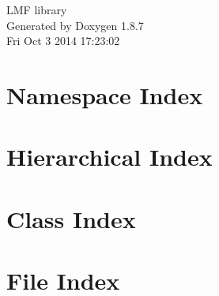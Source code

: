 \documentclass[twoside]{book}
\newcommand{\+}{\discretionary{\mbox{\scriptsize$\hookleftarrow$}}{}{}}
\newcommand{\clearemptydoublepage}{%
  \newpage{\pagestyle{empty}\cleardoublepage}%
}
\begin{document}
\hypersetup{pageanchor=false,
             bookmarks=true,
             bookmarksnumbered=true,
             pdfencoding=unicode
            }
\begin{titlepage}
\vspace*{7cm}
\begin{center}%
{\Large L\+M\+F library }\\
\vspace*{1cm}
{\large Generated by Doxygen 1.8.7}\\
\vspace*{0.5cm}
{\small Fri Oct 3 2014 17:23:02}\\
\end{center}
\end{titlepage}
\clearemptydoublepage
\tableofcontents
\clearemptydoublepage
{}
\hypersetup{pageanchor=true}

\chapter{Namespace Index}

\chapter{Hierarchical Index}

\chapter{Class Index}

\chapter{File Index}

\end{document}
